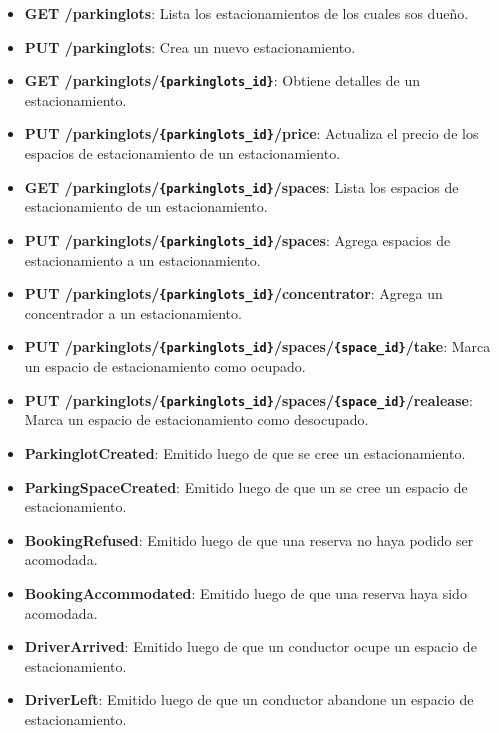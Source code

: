 \begin{itemize}
    \item \textbf{GET /parkinglots}: Lista los estacionamientos de los cuales sos dueño.
    \item \textbf{PUT /parkinglots}: Crea un nuevo estacionamiento.
    \item \textbf{GET /parkinglots/\texttt{\{parkinglots\_id\}}}: Obtiene detalles de un estacionamiento.
    \item \textbf{PUT /parkinglots/\texttt{\{parkinglots\_id\}}/price}: Actualiza el precio de los espacios de estacionamiento de un estacionamiento.
    \item \textbf{GET /parkinglots/\texttt{\{parkinglots\_id\}}/spaces}: Lista los espacios de estacionamiento de un estacionamiento.
    \item \textbf{PUT /parkinglots/\texttt{\{parkinglots\_id\}}/spaces}: Agrega espacios de estacionamiento a un estacionamiento.
    \item \textbf{PUT /parkinglots/\texttt{\{parkinglots\_id\}}/concentrator}: Agrega un concentrador a un estacionamiento.
    \item \textbf{PUT /parkinglots/\texttt{\{parkinglots\_id\}}/spaces/\texttt{\{space\_id\}}/take}: Marca un espacio de estacionamiento como ocupado.
    \item \textbf{PUT /parkinglots/\texttt{\{parkinglots\_id\}}/spaces/\texttt{\{space\_id\}}/realease}: Marca un espacio de estacionamiento como desocupado.
\end{itemize}



\begin{itemize}
    \item \textbf{ParkinglotCreated}: Emitido luego de que se cree un estacionamiento.
    \item \textbf{ParkingSpaceCreated}: Emitido luego de que un se cree un espacio de estacionamiento.
    \item \textbf{BookingRefused}: Emitido luego de que una reserva no haya podido ser acomodada.
    \item \textbf{BookingAccommodated}: Emitido luego de que una reserva haya sido acomodada.
    \item \textbf{DriverArrived}: Emitido luego de que un conductor ocupe un espacio de estacionamiento.
    \item \textbf{DriverLeft}: Emitido luego de que un conductor abandone un espacio de estacionamiento.
\end{itemize}


